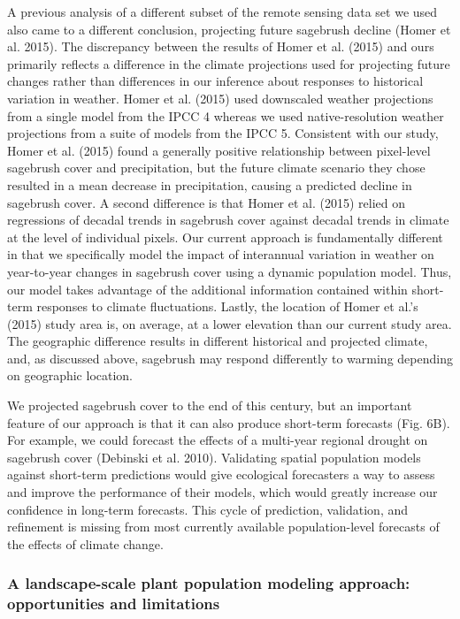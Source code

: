 \documentclass[12pt,]{article}
\begin{document}
A previous analysis of a different subset of the remote sensing data set
we used also came to a different conclusion, projecting future sagebrush
decline (Homer et al. 2015). The discrepancy between the results of
Homer et al. (2015) and ours primarily reflects a difference in the
climate projections used for projecting future changes rather than
differences in our inference about responses to historical variation in
weather. Homer et al. (2015) used downscaled weather projections from a
single model from the IPCC 4 whereas we used native-resolution weather
projections from a suite of models from the IPCC 5. Consistent with our
study, Homer et al. (2015) found a generally positive relationship
between pixel-level sagebrush cover and precipitation, but the future
climate scenario they chose resulted in a mean decrease in
precipitation, causing a predicted decline in sagebrush cover. A second
difference is that Homer et al. (2015) relied on regressions of decadal
trends in sagebrush cover against decadal trends in climate at the level
of individual pixels. Our current approach is fundamentally different in
that we specifically model the impact of interannual variation in
weather on year-to-year changes in sagebrush cover using a dynamic
population model. Thus, our model takes advantage of the additional
information contained within short-term responses to climate
fluctuations. Lastly, the location of Homer et al.'s (2015) study area
is, on average, at a lower elevation than our current study area. The
geographic difference results in different historical and projected
climate, and, as discussed above, sagebrush may respond differently to
warming depending on geographic location.

We projected sagebrush cover to the end of this century, but an
important feature of our approach is that it can also produce short-term
forecasts (Fig. 6B). For example, we could forecast the effects of a
multi-year regional drought on sagebrush cover (Debinski et al. 2010).
Validating spatial population models against short-term predictions
would give ecological forecasters a way to assess and improve the
performance of their models, which would greatly increase our confidence
in long-term forecasts. This cycle of prediction, validation, and
refinement is missing from most currently available population-level
forecasts of the effects of climate change.

\subsubsection{A landscape-scale plant population modeling approach:
opportunities and
limitations}\label{a-landscape-scale-plant-population-modeling-approach-opportunities-and-limitations}
\end{document}
